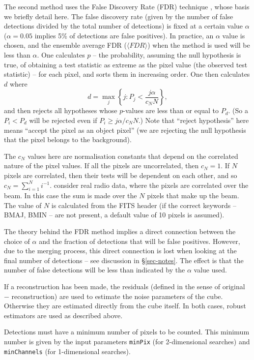 The second method uses the False Discovery Rate (FDR) technique
\citep{miller01,hopkins02}, whose basis we briefly detail here. The
false discovery rate (given by the number of false detections divided
by the total number of detections) is fixed at a certain value
$\alpha$ (\eg $\alpha=0.05$ implies 5\% of detections are false
positives). In practice, an $\alpha$ value is chosen, and the ensemble
average FDR (\ie $\langle FDR \rangle$) when the method is used will
be less than $\alpha$.  One calculates $p$ -- the probability,
assuming the null hypothesis is true, of obtaining a test statistic as
extreme as the pixel value (the observed test statistic) -- for each
pixel, and sorts them in increasing order. One then calculates $d$
where
\[
d = \max_j \left\{ j : P_j < \frac{j\alpha}{c_N N} \right\},
\]
and then rejects all hypotheses whose $p$-values are less than or
equal to $P_d$. (So a $P_i<P_d$ will be rejected even if $P_i \geq
j\alpha/c_N N$.) Note that ``reject hypothesis'' here means ``accept
the pixel as an object pixel'' (\ie we are rejecting the null
hypothesis that the pixel belongs to the background).

The $c_N$ values here are normalisation constants that depend on the
correlated nature of the pixel values. If all the pixels are
uncorrelated, then $c_N=1$. If $N$ pixels are correlated, then their
tests will be dependent on each other, and so $c_N = \sum_{i=1}^N
i^{-1}$. \citet{hopkins02} consider real radio data, where the pixels
are correlated over the beam. In this case the sum is made over the
$N$ pixels that make up the beam. The value of $N$ is calculated from
the FITS header (if the correct keywords -- BMAJ, BMIN -- are not
present, a default value of 10 pixels is assumed).

The theory behind the FDR method implies a direct connection between
the choice of $\alpha$ and the fraction of detections that will be
false positives. However, due to the merging process, this direct
connection is lost when looking at the final number of detections --
see discussion in \S\ref{sec-notes}. The effect is that the number of
false detections will be less than indicated by the $\alpha$ value
used.

If a reconstruction has been made, the residuals (defined in the sense
of original $-$ reconstruction) are used to estimate the noise
parameters of the cube. Otherwise they are estimated directly from the
cube itself. In both cases, robust estimators are used as described
above.

Detections must have a minimum number of pixels to be counted. This
minimum number is given by the input parameters \texttt{minPix} (for
2-dimensional searches) and \texttt{minChannels} (for 1-dimensional
searches).

